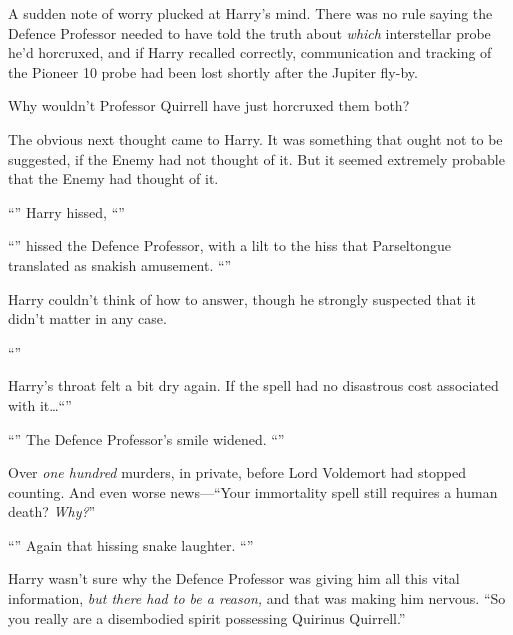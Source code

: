 A sudden note of worry plucked at Harry’s mind. There was no rule saying the Defence Professor needed to have told the truth about \emph{which} interstellar probe he’d horcruxed, and if Harry recalled correctly, communication and tracking of the Pioneer 10 probe had been lost shortly after the Jupiter fly-by.

Why wouldn’t Professor Quirrell have just horcruxed them both?

The obvious next thought came to Harry. It was something that ought not to be suggested, if the Enemy had not thought of it. But it seemed extremely probable that the Enemy had thought of it.

“” Harry hissed, “”

“” hissed the Defence Professor, with a lilt to the hiss that Parseltongue translated as snakish amusement. “”

Harry couldn’t think of how to answer, though he strongly suspected that it didn’t matter in any case.

“”

Harry’s throat felt a bit dry again. If the spell had no disastrous cost associated with it…“”

“” The Defence Professor’s smile widened. “”

Over \emph{one hundred} murders, in private, before Lord Voldemort had stopped counting. And even worse news—“Your immortality spell still requires a human death? \emph{Why?}”

“” Again that hissing snake laughter. “”

Harry wasn’t sure why the Defence Professor was giving him all this vital information, \emph{but there had to be a reason,} and that was making him nervous. “So you really are a disembodied spirit possessing Quirinus Quirrell.”

